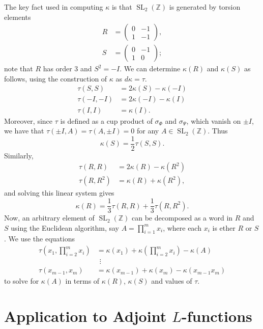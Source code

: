 \documentclass[10pt]{amsart}
\theoremstyle{plain}
\theoremstyle{definition}
\newcommand{\ZZ}{{\mathbb{Z}}}
\DeclareMathOperator{\SL}{SL}
\begin{document}
The key fact used in computing $\kappa$ is that $\SL_2(\ZZ)$ is generated by torsion elements
\begin{align*}
R &= \begin{pmatrix} 0 & -1 \\ 1 & -1 \end{pmatrix}, \\
S &= \begin{pmatrix} 0 & -1 \\ 1 & 0 \end{pmatrix};
\end{align*}
note that $R$ has order $3$ and $S^2 = -I$.  We can determine $\kappa(R)$ and $\kappa(S)$ as follows, using the construction of $\kappa$ as $d\kappa = \tau$.
\begin{align*}
\tau(S,S) &= 2\kappa(S) - \kappa(-I) \\
\tau(-I,-I) &= 2\kappa(-I) - \kappa(I) \\
\tau(I,I) &= \kappa(I).
\end{align*}
Moreover, since $\tau$ is defined as a cup product of $\sigma_\Phi$ and $\sigma_\Psi$, which vanish on $\pm I$, we have that $\tau(\pm I, A) = \tau(A, \pm I) = 0$ for any $A \in \SL_2(\ZZ)$.  Thus
\begin{equation}
\kappa(S) = \frac12 \tau(S,S).
\end{equation}
Similarly,
\begin{align*}
\tau(R,R) &= 2\kappa(R) - \kappa(R^2) \\
\tau(R,R^2) &= \kappa(R) + \kappa(R^2),
\end{align*}
and solving this linear system gives
\begin{equation}
\kappa(R) = \frac13 \tau(R,R) + \frac13 \tau(R,R^2).
\end{equation}
Now, an arbitrary element of $\SL_2(\ZZ)$ can be decomposed as a word in $R$ and $S$ using the Euclidean algorithm, say $A = \prod_{i=1}^m x_i$, where each $x_i$ is ether $R$ or $S$.  We use the equations
\begin{align*}
\tau(x_1, \prod_{i=2}^m x_i) &= \kappa(x_1) + \kappa(\prod_{i=2}^m x_i) - \kappa(A) \\
&\hspace{5pt}\vdots \\
\tau(x_{m-1}, x_m) &= \kappa(x_{m-1}) + \kappa(x_m) - \kappa(x_{m-1}x_m)
\end{align*}
to solve for $\kappa(A)$ in terms of $\kappa(R)$, $\kappa(S)$ and values of $\tau$.

\section{Application to Adjoint $L$-functions} \label{sec:adjoint}
\end{document}
